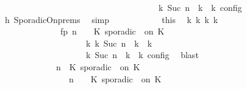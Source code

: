 \begin{isabellebody}
\ \ \ \ \ \ \ \ \ \ \ \ \ \ \ \ \ \ \ \ \ \ \ \ \ \ \ \ \ \ \ \ \ {\isasymand}\ {\isacharparenleft}{\isasymrho}\ {\isasymin}\ {\isasymlbrakk}\ {\isasymGamma}\isactrlsub k{\isacharcomma}\ Suc\ n\ {\isasymturnstile}\ {\isasymPsi}\isactrlsub k\ {\isasymtriangleright}\ {\isasymPhi}\isactrlsub k\ {\isasymrbrakk}\isactrlsub c\isactrlsub o\isactrlsub n\isactrlsub f\isactrlsub i\isactrlsub g{\isacharparenright}{\isacartoucheclose}\isanewline
\ \ \ \ \ \ \ \ \ \ \ \ \isamarkupfalse%
\ h{}\ SporadicOn{\isachardot}prems\ \isamarkupfalse%
\ simp\isanewline
\ \ \ \ \ \ \ \ \ \ \isamarkupfalse%
\ this\ \isamarkupfalse%
\ {\isasymGamma}\isactrlsub k\ {\isasymPsi}\isactrlsub k\ {\isasymPhi}\isactrlsub k\ k\ \isanewline
\ \ \ \ \ \ \ \ \ \ \ \ \ \ fp{\isacharcolon}{\isacartoucheopen}{\isacharparenleft}{\isacharparenleft}{\isasymGamma}{\isacharcomma}\ n\ {\isasymturnstile}\ {\isasymPsi}\ {\isasymtriangleright}\ {\isacharparenleft}{\isacharparenleft}K\ sporadic\ {\isasymtau}\ on\ K\ {\isacharhash}\ {\isasymPhi}{\isacharparenright}{\isacharparenright}\isanewline
\ \ \ \ \ \ \ \ \ \ \ \ \ \ \ \ \ \ \ \ {\isasymhookrightarrow}\isactrlbsup k\isactrlesup \ {\isacharparenleft}{\isasymGamma}\isactrlsub k{\isacharcomma}\ Suc\ n\ {\isasymturnstile}\ {\isasymPsi}\isactrlsub k\ {\isasymtriangleright}\ {\isasymPhi}\isactrlsub k{\isacharparenright}{\isacharparenright}\isanewline
\ \ \ \ \ \ \ \ \ \ \ \ \ \ \ \ {\isasymand}\ {\isasymrho}\ {\isasymin}\ {\isasymlbrakk}\ {\isasymGamma}\isactrlsub k{\isacharcomma}\ Suc\ n\ {\isasymturnstile}\ {\isasymPsi}\isactrlsub k\ {\isasymtriangleright}\ {\isasymPhi}\isactrlsub k\ {\isasymrbrakk}\isactrlsub c\isactrlsub o\isactrlsub n\isactrlsub f\isactrlsub i\isactrlsub g{\isacartoucheclose}\ \isamarkupfalse%
\ blast\isanewline
\ \ \ \ \ \ \ \ \ \ \isamarkupfalse%
\isanewline
\ \ \ \ \ \ \ \ \ \ \ \ {\isacartoucheopen}{\isacharparenleft}{\isasymGamma}{\isacharcomma}\ n\ {\isasymturnstile}\ {\isacharparenleft}{\isacharparenleft}K\ sporadic\ {\isasymtau}\ on\ K\ {\isacharhash}\ {\isasymPsi}{\isacharparenright}\ {\isasymtriangleright}\ {\isasymPhi}{\isacharparenright}\isanewline
\ \ \ \ \ \ \ \ \ \ \ \ \ \ {\isasymhookrightarrow}\ {\isacharparenleft}{\isasymGamma}{\isacharcomma}\ n\ {\isasymturnstile}\ {\isasymPsi}\ {\isasymtriangleright}\ {\isacharparenleft}{\isacharparenleft}K\ sporadic\ {\isasymtau}\ on\ K\ {\isacharhash}\ {\isasymPhi}{\isacharparenright}{\isacharparenright}{\isacartoucheclose}\isanewline

\end{isabellebody}
